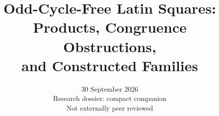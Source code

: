 \documentclass[11pt]{article}
\title{Odd-Cycle-Free Latin Squares:\\
Products, Congruence Obstructions,\\
and Constructed Families}
\author{}
\date{30 September 2026\\\small Research dossier: compact companion\\Not externally peer reviewed}
\begin{document}
\dossierfrontmatter

















\clearpage

\dossierreferences
\end{document}
